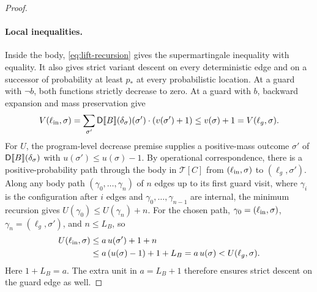 \begin{proof}
\paragraph{Local inequalities.}
Inside the body, \eqref{eq:lift-recursion} gives the supermartingale
inequality with equality. It also gives strict variant descent on every
deterministic edge and on a successor of probability at least $p_*$ at
every probabilistic location. At a guard with $\neg b$, both functions
strictly decrease to zero. At a guard with $b$, backward expansion and
mass preservation give
\[
 V(\ell_{\rm in},\sigma)
 =\sum_{\sigma'}\mathsf{D}\llbracket B\rrbracket(\delta_{\sigma})(\sigma')
                         \cdot(v(\sigma')+1)
 \leq v(\sigma)+1=V(\ell_g,\sigma).
\]
For $U$, the program-level decrease premise supplies a positive-mass
outcome $\sigma'$ of $\mathsf{D}\llbracket B\rrbracket(\delta_{\sigma})$ with
$u(\sigma')\leq u(\sigma)-1$. By operational correspondence, there is
a positive-probability path through the body in $\mathcal T[C]$ from
$(\ell_{\rm in},\sigma)$ to $(\ell_g,\sigma')$.
Along any body path $(\gamma_0,\ldots,\gamma_n)$ of $n$ edges up to
its first guard visit, where $\gamma_i$ is the configuration after $i$
edges and $\gamma_0,\ldots,\gamma_{n-1}$ are internal, the minimum
recursion gives $U(\gamma_0)\leq U(\gamma_n)+n$.
For the chosen path, $\gamma_0=(\ell_{\rm in},\sigma)$,
$\gamma_n=(\ell_g,\sigma')$, and $n\leq L_B$, so
\begin{align*}
 U(\ell_{\rm in},\sigma)
 &\leq a\,u(\sigma')+1+n\\
 &\leq a\,(u(\sigma)-1)+1+L_B
  =a\,u(\sigma)<U(\ell_g,\sigma).
\end{align*}
Here $1+L_B=a$. The extra unit in $a=L_B+1$
therefore ensures strict descent on the guard edge as well.


\end{proof}
